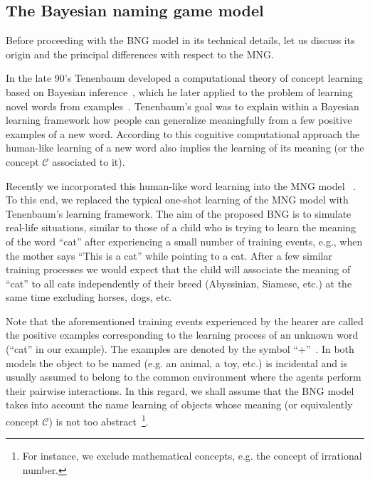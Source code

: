 \documentclass[review]{elsarticle}
\newcommand{\+}{\! + \!}
\begin{document}
 

\subsection{The Bayesian naming game model} 
\label{sec:BNG}


Before proceeding with the BNG model in its technical details, let us discuss its origin and the principal differences with respect to the MNG.


In the late 90's Tenenbaum developed a computational theory of concept learning based on Bayesian inference~\cite{Tenenbaum-1999}, which he later applied to the problem of learning novel words from examples~\cite{Xu-2007a, Tenenbaum-2000b}. 
Tenenbaum's goal was to explain within a Bayesian learning framework how people can generalize meaningfully from  a few positive examples of a new word. According to this cognitive computational approach the human-like learning of a new word also implies the learning of its meaning (or the concept $\mathcal{C}$ associated to it).

Recently  we incorporated this human-like word learning into the MNG model ~\cite{Marchetti-2020a, Marchetti-2020b}. 
To this end, we replaced the typical one-shot learning of the MNG model with Tenenbaum's learning framework. 
The aim of the proposed BNG is to simulate real-life situations, similar to those of a child who is trying to learn the meaning of the word “cat” after experiencing a small number of training events, e.g., when the mother says “This is a cat” while pointing to a cat. 
After a few similar training processes we would expect that the child will associate the meaning of “cat” to all cats independently of their breed (Abyssinian, Siamese, etc.) at the same time excluding horses, dogs, etc.


Note that the aforementioned training events experienced by the hearer are called the positive examples corresponding to the learning process of an unknown word  (“cat” in our example). 
The examples are denoted  by the symbol ``+''~\cite{Tenenbaum-1999}. 
In both models the object to be named (e.g. an animal, a toy, etc.) is incidental and is usually assumed to belong to the common environment where the agents perform their pairwise interactions. 
In this regard,  we shall assume that the BNG model takes into account the name learning of objects whose meaning (or equivalently concept $\mathcal{C}$) is not too abstract~\footnote{For instance, we exclude mathematical concepts, e.g. the concept of irrational number.}.
\end{document}
